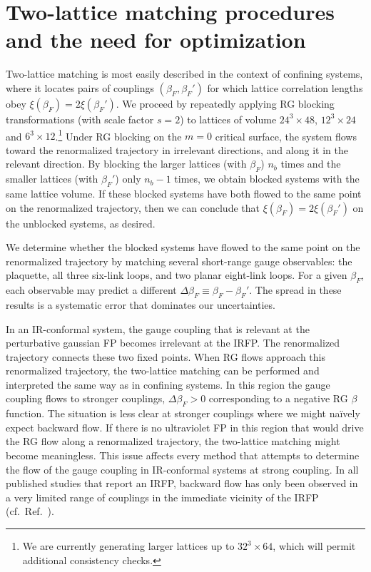\documentclass{PoS}
\newcommand{\be}{\ensuremath{\beta} }
\newcommand{\De}{\ensuremath{\Delta} }
\newcommand{\X}{\ensuremath{\!\times\!} }
\newcommand{\refcite}[1]{Ref.~\cite{#1}}
\begin{document}
\section{Two-lattice matching procedures and the need for optimization} %
Two-lattice matching is most easily described in the context of confining systems, where it locates pairs of couplings $(\be_F, \be_F')$ for which lattice correlation lengths obey $\xi(\be_F) = 2\xi(\be_F')$.
We proceed by repeatedly applying RG blocking transformations (with scale factor $s = 2$) to lattices of volume $24^3\X48$, $12^3\X24$ and $6^3\X12$.\footnote{We are currently generating larger lattices up to $32^3\X64$, which will permit additional consistency checks.}
Under RG blocking on the $m = 0$ critical surface, the system flows toward the renormalized trajectory in irrelevant directions, and along it in the relevant direction.
By blocking the larger lattices (with $\be_F$) $n_b$ times and the smaller lattices (with $\be_F'$) only $n_b - 1$ times, we obtain blocked systems with the same lattice volume.
If these blocked systems have both flowed to the same point on the renormalized trajectory, then we can conclude that $\xi(\be_F) = 2\xi(\be_F')$ on the unblocked systems, as desired.

We determine whether the blocked systems have flowed to the same point on the renormalized trajectory by matching several short-range gauge observables: the plaquette, all three six-link loops, and two planar eight-link loops.
For a given $\be_F$, each observable may predict a different $\De\be_F \equiv \be_F - \be_F'$.
The spread in these results is a systematic error that dominates our uncertainties.

In an IR-conformal system, the gauge coupling that is relevant at the perturbative gaussian FP becomes irrelevant at the IRFP.
The renormalized trajectory connects these two fixed points.
When RG flows approach this renormalized trajectory, the two-lattice matching can be performed and interpreted the same way as in confining systems.
In this region the gauge coupling flows to stronger couplings, $\De\be_F > 0$ corresponding to a negative RG \be function.
The situation is less clear at stronger couplings where we might na\"ively expect backward flow.
If there is no ultraviolet FP in this region that would drive the RG flow along a renormalized trajectory, the two-lattice matching might become meaningless.
This issue affects every method that attempts to determine the flow of the gauge coupling in IR-conformal systems at strong coupling.
In all published studies that report an IRFP, backward flow has only been observed in a very limited range of couplings in the immediate vicinity of the IRFP (cf.~\refcite{Giedt:2012LAT}).
\end{document}
